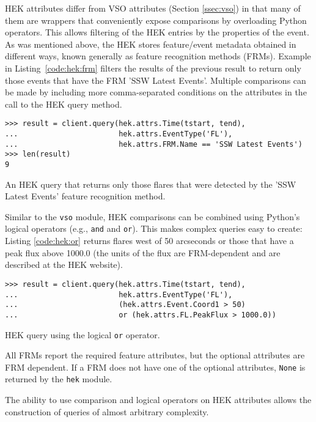 HEK attributes differ from VSO attributes (Section \ref{ssec:vso}) in that many 
of them are wrappers that conveniently expose comparisons by overloading Python 
operators. This allows filtering of the HEK entries by the properties of the 
event. As was mentioned above, the HEK stores feature/event metadata obtained 
in different ways, known generally as feature recognition methods (FRMs). 
Example in Listing~\ref{code:hek:frm} filters the results of the previous 
result to return only those events that have the FRM 'SSW Latest Events'.  Multiple comparisons can be made by including more comma-separated
conditions on the attributes in the call to the HEK query method.

\begin{listing}[H]
\begin{verbatim}
>>> result = client.query(hek.attrs.Time(tstart, tend), 
...                       hek.attrs.EventType('FL'),
...                       hek.attrs.FRM.Name == 'SSW Latest Events')
>>> len(result)
9
\end{verbatim}
\caption{An HEK query that returns only those flares that were
  detected by the 'SSW Latest Events' feature recognition method.}
\label{code:hek:frm}
\end{listing}

Similar to the \texttt{vso} module, HEK comparisons can be combined using Python's logical operators (e.g., \texttt{and}
and \texttt{or}). This makes complex queries easy to create: Listing \ref{code:hek:or} 
returns flares west of 50 arcseconds or those that have a peak flux above 
1000.0 (the units of the flux are FRM-dependent and are described at the HEK 
website).
\begin{listing}[H]
\begin{verbatim}
>>> result = client.query(hek.attrs.Time(tstart, tend), 
...                       hek.attrs.EventType('FL'),
...                       (hek.attrs.Event.Coord1 > 50) 
...                       or (hek.attrs.FL.PeakFlux > 1000.0))
\end{verbatim}
\caption{HEK query using the logical \texttt{or} operator.}
\label{code:hek:or}
\end{listing}
All FRMs report the required feature attributes, but the optional attributes 
are FRM dependent.  If a FRM does not have one of the optional attributes, 
\texttt{None} is returned by the \texttt{hek} module. 

The ability to use comparison and logical operators on HEK attributes allows 
the construction of queries of almost arbitrary complexity.

